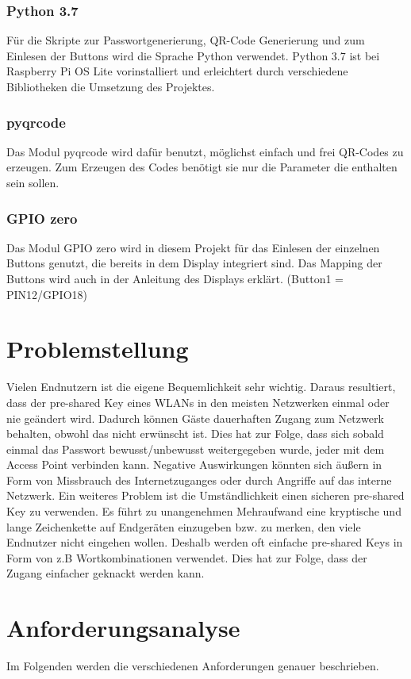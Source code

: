 \documentclass[a4paper,11pt,singlespacing]{article}
\begin{document}
    		\subsubsection{Python 3.7}
    			Für die Skripte zur Passwortgenerierung, QR-Code Generierung und zum Einlesen der Buttons wird die Sprache Python verwendet. Python 3.7 ist bei Raspberry Pi OS Lite  vorinstalliert und erleichtert durch verschiedene Bibliotheken die Umsetzung des Projektes.
    			\subsubsection{pyqrcode}
    				Das Modul pyqrcode wird dafür benutzt, möglichst einfach und frei QR-Codes zu erzeugen. Zum Erzeugen des Codes benötigt sie nur die Parameter die enthalten sein sollen. \cite{Quote_pyqrcode}
    			\subsubsection{GPIO zero}
    				Das Modul GPIO zero wird in diesem Projekt für das Einlesen der einzelnen Buttons genutzt, die bereits in dem Display integriert sind. Das Mapping der Buttons wird auch in der Anleitung des Displays erklärt. (Button1 = PIN12/GPIO18) \cite{Quote_gpio_zero}
    	
    	
    \section{Problemstellung}
    	Vielen Endnutzern ist die eigene Bequemlichkeit sehr wichtig. Daraus resultiert, dass der pre-shared Key eines WLANs in den meisten Netzwerken einmal oder nie geändert wird. Dadurch können Gäste dauerhaften Zugang zum Netzwerk behalten, obwohl das nicht erwünscht ist. Dies hat zur Folge, dass sich sobald einmal das Passwort bewusst/unbewusst weitergegeben wurde, jeder mit dem Access Point verbinden kann. Negative Auswirkungen könnten sich äußern in Form von Missbrauch des Internetzuganges oder durch Angriffe auf das interne Netzwerk. Ein weiteres Problem ist die Umständlichkeit einen sicheren pre-shared Key zu verwenden. Es führt zu unangenehmen Mehraufwand eine kryptische und lange Zeichenkette auf Endgeräten einzugeben bzw. zu merken, den viele Endnutzer nicht eingehen wollen. Deshalb werden oft einfache pre-shared Keys in Form von z.B Wortkombinationen verwendet. Dies hat zur Folge, dass der Zugang einfacher geknackt werden kann.
    	
   \section{Anforderungsanalyse}
    		Im Folgenden werden die verschiedenen Anforderungen genauer beschrieben.
\end{document}
